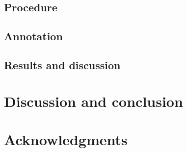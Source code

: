 \documentclass[10pt,letterpaper]{article}
\begin{document}
\subsection{Procedure}

\subsection{Annotation}

\subsection{Results and discussion}

\section{Discussion and conclusion}

\section{Acknowledgments}
\small





\setlength{\bibleftmargin}{.125in}
\setlength{\bibindent}{-\bibleftmargin}


\end{document}
